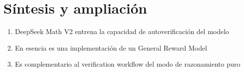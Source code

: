 \section{Síntesis y ampliación}
\begin{enumerate}
  \item DeepSeek Math V2 entrena la capacidad de autoverificación del modelo
  \item En esencia es una implementación de un General Reward Model
  \item Es complementario al verification workflow del modo de razonamiento puro
\end{enumerate}


